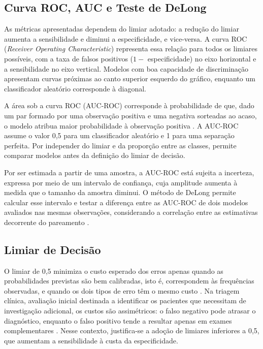 \subsection{Curva ROC, AUC e Teste de DeLong}
\label{sec:fund_roc}
\label{sec:fund_delong}

As métricas apresentadas dependem do limiar adotado: a redução do limiar aumenta a sensibilidade e diminui a especificidade, e vice-versa. A curva ROC (\textit{Receiver Operating Characteristic}) representa essa relação para todos os limiares possíveis, com a taxa de falsos positivos ($1 -$ especificidade) no eixo horizontal e a sensibilidade no eixo vertical. Modelos com boa capacidade de discriminação apresentam curvas próximas ao canto superior esquerdo do gráfico, enquanto um classificador aleatório corresponde à diagonal.

A área sob a curva ROC (AUC-ROC) corresponde à probabilidade de que, dado um par formado por uma observação positiva e uma negativa sorteadas ao acaso, o modelo atribua maior probabilidade à observação positiva \cite{FAWCETT2006861, Hanley1982Meaning}. A AUC-ROC assume o valor 0,5 para um classificador aleatório e 1 para uma separação perfeita. Por independer do limiar e da proporção entre as classes, permite comparar modelos antes da definição do limiar de decisão.

Por ser estimada a partir de uma amostra, a AUC-ROC está sujeita a incerteza, expressa por meio de um intervalo de confiança, cuja amplitude aumenta à medida que o tamanho da amostra diminui. O método de DeLong \cite{DeLong1988Comparing} permite calcular esse intervalo e testar a diferença entre as AUC-ROC de dois modelos avaliados nas mesmas observações, considerando a correlação entre as estimativas decorrente do pareamento \cite{DeLong1988Comparing, Robin2011pROC}.

\subsection{Limiar de Decisão}
\label{sec:fund_limiar}

O limiar de 0,5 minimiza o custo esperado dos erros apenas quando as probabilidades previstas são bem calibradas, isto é, correspondem às frequências observadas, e quando os dois tipos de erro têm o mesmo custo \cite{Elkan2001Foundations}. Na triagem clínica, avaliação inicial destinada a identificar os pacientes que necessitam de investigação adicional, os custos são assimétricos: o falso negativo pode atrasar o diagnóstico, enquanto o falso positivo tende a resultar apenas em exames complementares \cite{Habibzadeh2016Determining}. Nesse contexto, justifica-se a adoção de limiares inferiores a 0,5, que aumentam a sensibilidade à custa da especificidade.

